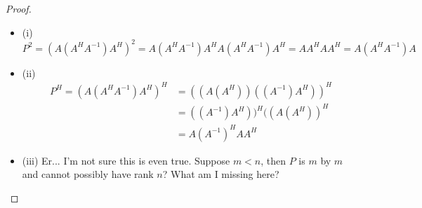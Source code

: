 \documentclass[12pt]{article}
\newenvironment{problem}[2][Problem]{\begin{trivlist}
\item[\hskip \labelsep {\bfseries #1}\hskip \labelsep {\bfseries #2.}]}{\end{trivlist}}
\theoremstyle{definition}
\theoremstyle{definition}
\theoremstyle{definition}
\theoremstyle{definition}
\begin{document}
\begin{problem}{3.47}
\begin{proof}
\begin{itemize}
\item (i) $$P^2 = (A(A^HA^{-1})A^H)^2 = A(A^HA^{-1})A^HA(A^HA^{-1})A^H = AA^HAA^H = A(A^HA^{-1})A$$
\item (ii) \begin{align*}P^H = (A(A^HA^{-1})A^H)^H &= ((A(A^H))((A^{-1})A^H))^H \\
&=((A^{-1})A^H))^H((A(A^H))^H \\
&=A(A^{-1})^HAA^H
\end{align*}
\item (iii) Er... I'm not sure this is even true. Suppose $m < n$, then $P$ is $m$ by $m$ and cannot possibly have rank $n$? What am I missing here?
\end{itemize}
\end{proof}
\end{problem}
\end{document}
